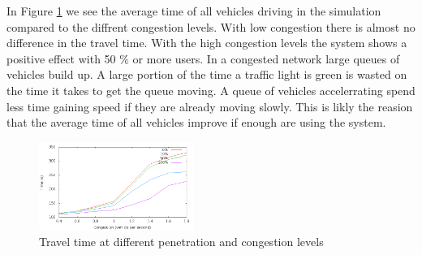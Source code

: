 In Figure \ref{fig:TestResults:congestionTime} we see the average time of all vehicles driving in the simulation compared to the diffrent congestion levels. 
With low congestion there is almost no difference in the travel time.
With the high congestion levels the system shows a positive effect with 50 \% or more users. 
In a congested network large queues of vehicles build up. 
A large portion of the time a traffic light is green is wasted on the time it takes to get the queue moving. 
A queue of vehicles accelerrating spend less time gaining speed if they are already moving slowly. 
This is likly the reasion that the average time of all vehicles improve if enough are using the system.
\begin{figure}[htb]
\includegraphics[width=0.45\textwidth]{../images/timeCongestion.png}
\caption{Travel time at different penetration and congestion levels}
\label{fig:TestResults:congestionTime}
\end{figure}



